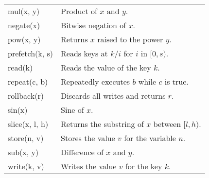 \documentclass[12pt]{article}
\begin{document}
\begin{table}[ht]
\begin{tabular}{l | l}
mul(x, y)                & Product of $x$ and $y$.                                                \\
negate(x)                & Bitwise negation of $x$.                                               \\
pow(x, y)                & Returns $x$ raised to the power $y$.                                   \\
prefetch(k, s)           & Reads keys at $k/i$ for $i$ in $[0, s)$.                               \\
read(k)                  & Reads the value of the key $k$.                                        \\
repeat(c, b)             & Repeatedly executes $b$ while $c$ is true.                             \\
rollback(r)              & Discards all writes and returns $r$.                                   \\
sin(x)                   & Sine of $x$.                                                           \\
slice(x, l, h)           & Returns the substring of $x$ between $[l, h)$.                         \\
store(n, v)              & Stores the value $v$ for the variable $n$.                             \\
sub(x, y)                & Difference of $x$ and $y$.                                             \\
write(k, v)              & Writes the value $v$ for the key $k$.                                  \\
\end{tabular}
\label{table:expressions}
\end{table}
\end{document}
